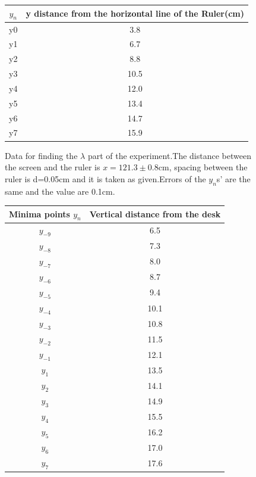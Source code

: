 \documentclass[10pt,a4paper]{article}
\begin{document}
{\begin{center}
\begin{figure} [H] 
\begin{tabular}{|c |c|} \hline
$y_n$& y distance from the horizontal line of the Ruler(cm) \\ [0.5ex] 
\hline
y0&3.8 \\
\hline
y1 & 6.7\\
\hline 
y2 &8.8\\
\hline 
y3& 10.5 \\
\hline 
y4 & 12.0\\
\hline 
y5 &13.4\\
\hline 
y6 & 14.7\\
\hline
y7&15.9\\
\hline		
\end{tabular}
		\caption{Data for finding the $\lambda$ part of the experiment.The distance between the screen and the ruler is $x=121.3\pm0.8$cm, spacing between the ruler is d=0.05cm and it is taken as given.Errors of the $y_n$s' are the same and the value are 0.1cm.}
	\end{figure}
\end{center}
\begin{center}
	\begin{figure} [H] 
		\begin{tabular}{|c |c|} \hline
			Minima points $y_n$& Vertical distance from the desk \\ [0.5ex] 
			\hline
			$y_{-9}$&6.5 \\
			\hline
			$y_{-8}$ & 7.3\\
			\hline 
		$y_{-7}$ &8.0\\
			\hline 
			$y_{-6}$& 8.7 \\
			\hline 
		$y_{-5}$ & 9.4 \\
			\hline 
			$y_{-4}$ &10.1\\
			\hline 
		$y_{-3}$ & 10.8\\
			\hline
			$y_{-2}$&11.5\\
			\hline
			$y_{-1}$&12.1 \\
			\hline
			$y_{1}$ &13.5\\
			\hline 
			$y_{2}$ &14.1\\
			\hline 
		$y_{3}$& 14.9 \\
			\hline 
			$y_{4}$ & 15.5\\
			\hline 
		$y_{5}$ &16.2\\
			\hline 
			$y_{6}$ & 17.0\\
			\hline
			$y_{7}$&17.6\\

\end{tabular}
\end{figure}
\end{center}}
\end{document}
